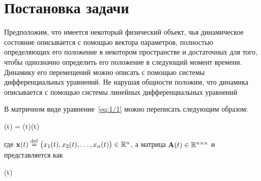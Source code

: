 


\chapter{Постановка задачи}
\newcommand{\funcF}{ \calf{F}         } %
\newcommand{\optF}{  \optimum{\funcF} } %



Предположим, что имеется некоторый физический объект, чья динамическое состояние описывается с помощью вектора параметров, полностью определяющих его положение в некотором пространстве и достаточных для того, чтобы однозначно определить его положение в следующий момент времени. Динамику его перемещений можно описать с помощью системы дифференциальных уравнений. Не нарушая общности положим, что динамика описывается с помощью системы линейных дифференциальных уравнений

\eeq

В матричном виде уравнение~\ref{eq:1/1} можно переписать следующим образом:

    (t) = (t)(t) \text{,}
\eeq

где $\mathbf{x}(t) \stackrel{ \mathrm{def} }{=} \bigl(x_1(t), x_2(t), \ldots, x_n(t)\bigr) \in \mathbb{R}^{n}$, а матрица $\mathbf{A}(t) \in \mathbb{R}^{{n} \times {n}}$ и представляется как

\beqn
    (t) \eqdef {} 
\eeqn

